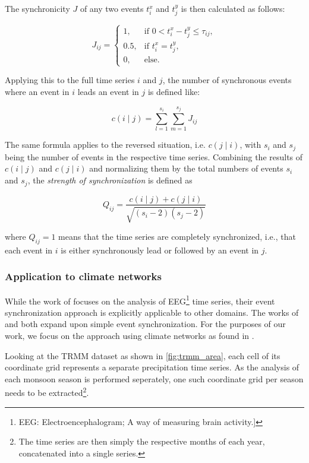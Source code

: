 The synchronicity $J$ of any two events $t_i^x$ and $t_j^y$ is then calculated as follows:

\begin{equation}
  J_{ij} =
  \begin{cases}
    1, & \text{if } 0<t^x_i-t^y_j\leq\tau_{ij}, \\
    0.5, & \text{if } t^x_i=t^y_j, \\
    0, & \text{else.}
  \end{cases}
\end{equation}

Applying this to the full time series $i$ and $j$, the number of synchronous events where an event in $i$ leads an event in $j$ is defined like:

\begin{equation}
  c(i \mid j) = \sum\limits^{s_i}_{l=1} \sum\limits^{s_j}_{m=1} J_{ij}
\end{equation}

The same formula applies to the reversed situation, i.e. $c(j \mid i)$, with $s_i$ and $s_j$ being the number of events in the respective time series. Combining the results of $c(i\mid j)$ and $c(j \mid i)$ and normalizing them by the total numbers of events $s_i$ and $s_j$, the \textit{strength of synchronization} is defined as

\begin{equation}
  Q_{ij} = \frac{c(i \mid j) + c(j \mid i)}{\sqrt{(s_i - 2)(s_j - 2)}}
\end{equation}

where $Q_{ij} = 1$ means that the time series are completely synchronized, i.e., that each event in $i$ is either synchronously lead or followed by an event in $j$.

\subsubsection{Application to climate networks}
\label{ssst:appl_climate_networks}
While the work of \citet{QuianQuiroga.2002} focuses on the analysis of EEG\footnote{EEG: Electroencephalogram; A way of measuring brain activity.]} time series, their event synchronization approach is explicitly applicable to other domains. The works of \citet{Malik.2010} and \citet{Stolbova.2015} both expand upon simple event synchronization. For the purposes of our work, we focus on the approach using climate networks as found in \citet{Stolbova.2015}.

Looking at the TRMM dataset as shown in \cref{fig:trmm_area}, each cell of its coordinate grid represents a separate precipitation time series. As the analysis of each monsoon season is performed seperately, one such coordinate grid per season needs to be extracted\footnote{The time series are then simply the respective months of each year, concatenated into a single series.}.

